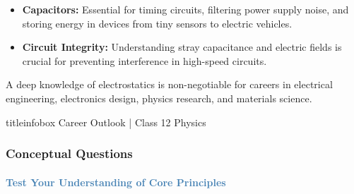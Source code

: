 \begin{frame}
\begin{frame}
\vspace{0.3cm}

\begin{examplebox}
\vspace{0.1cm}
\begin{itemize}
    \item \textbf{Capacitors:} Essential for timing circuits, filtering power supply noise, and storing energy in devices from tiny sensors to electric vehicles.
    \item \textbf{Circuit Integrity:} Understanding stray capacitance and electric fields is crucial for preventing interference in high-speed circuits.
\end{itemize}
\vspace{0.1cm}
\end{examplebox}

\vspace{0.3cm}

\begin{importantbox}
\vspace{0.1cm}
A deep knowledge of electrostatics is non-negotiable for careers in electrical engineering, electronics design, physics research, and materials science.
\vspace{0.1cm}
\end{importantbox}

\vfill

\begin{beamercolorbox}[wd=\textwidth,ht=0.5cm,dp=0.1cm,center]{titleinfobox}
    \small\color{coolgray} Career Outlook | Class 12 Physics
\end{beamercolorbox}
\end{frame}

\begin{frame}
\frametitle{\textsf{\textbf{Conceptual Questions}}}
\framesubtitle{\textcolor{steelblue}{Test Your Understanding of Core Principles}}


\end{frame}
\end{frame}

